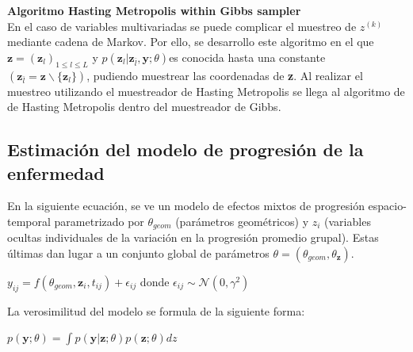 \documentclass[12pt]{article}
\begin{document}
\begin{description}
	\item {\textbf{Algoritmo Hasting Metropolis within Gibbs sampler }}\\
	En el caso de variables multivariadas se puede complicar el muestreo de $z^{(k)}$ mediante cadena de Markov. Por ello, se desarrollo este algoritmo en el que $\mathbf{z}=(\mathbf{z}_{l})_{1\leq l\leq L}$ y $p(\mathbf{z}_{l}|\mathbf{z}_{\bar{l}}, \mathbf{y};\theta)$	​ es conocida hasta una constante $(\mathbf{z}_{\bar{l}}=\mathbf{z} \backslash \{{\mathbf{z}_{l}}\})$, pudiendo muestrear las coordenadas de \textbf{z}. Al realizar el muestreo utilizando el muestreador de Hasting Metropolis se llega al algoritmo de de Hasting Metropolis dentro del muestreador de Gibbs.
\end{description}

\subsection{Estimación del modelo de progresión de la enfermedad}
En la siguiente ecuación, se ve un modelo de efectos mixtos de progresión espacio-temporal parametrizado por $\theta_{geom}$ (parámetros geométricos) y $z_{i}$ (variables ocultas individuales de la variación en la progresión promedio grupal). Estas últimas dan lugar a un conjunto global de parámetros $\theta=(\theta_{geom}, \theta_{\mathbf{z}})$.
\begin{center}
	$y_{ij}=f(\theta_{geom},\mathbf{z}_{i},t_{ij})+\epsilon_{ij}$ donde $\epsilon_{ij} \sim \mathcal{N}(0, \gamma^{2})$
\end{center}

La verosimilitud del modelo se formula de la siguiente forma:
\begin{center}
	$p(\mathbf{y};\theta) = \int p(\mathbf{y}|\mathbf{z};\theta)p(\mathbf{z};\theta)dz$
\end{center}
\end{document}
